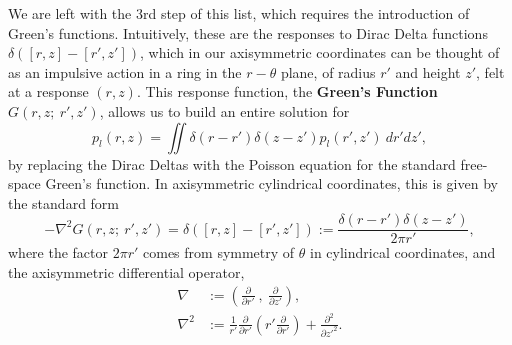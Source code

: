 \documentclass[11pt,a4paper]{article}
\begin{document}
	We are left with the 3rd step of this list, which requires the introduction of Green's functions. Intuitively, these are the responses to Dirac Delta functions $\delta([r,z] - [r', z'])$, which in our axisymmetric coordinates can be thought of as an impulsive action in a ring in the $r-\theta$ plane, of radius $r'$ and height $z'$, felt at a response $(r,z)$. This response function, the \textbf{Green's Function} $G(r,z;\ r',z')$, allows us to build an entire solution for
	\begin{equation}
		\label{PressureDelta}
		p_l(r,z) = \iint \delta(r-r')\delta(z-z')p_l(r',z') \ dr'dz',
	\end{equation}
	by replacing the Dirac Deltas with the Poisson equation for the standard free-space Green's function. In axisymmetric cylindrical coordinates, this is given by the standard form 
	\begin{equation}
		\label{GreenFreeSpace}
		-\nabla ^2G(r,z;\ r',z') = \delta([r,z] - [r', z']) := \frac{\delta(r-r')\delta(z-z')}{2\pi r'},
	\end{equation}
	where the factor $2\pi r'$ comes from symmetry of $\theta$ in cylindrical coordinates, and the axisymmetric differential operator,
	\begin{subequations}
		\label{NablaCyl}
		\begin{align}
			\nabla &:= \left( \frac{\partial }{\partial r'}\ ,\ \frac{\partial }{\partial z'} \right), \label{NablaCyl:1} \\
			\nabla^2 &:= \frac{1}{r'} \frac{\partial }{\partial r'} \left( r' \frac{\partial }{\partial r'} \right) + \frac{\partial ^2}{\partial z'^2}. \label{NablaCyl:2}
		\end{align}
	\end{subequations}
	
\end{document}
